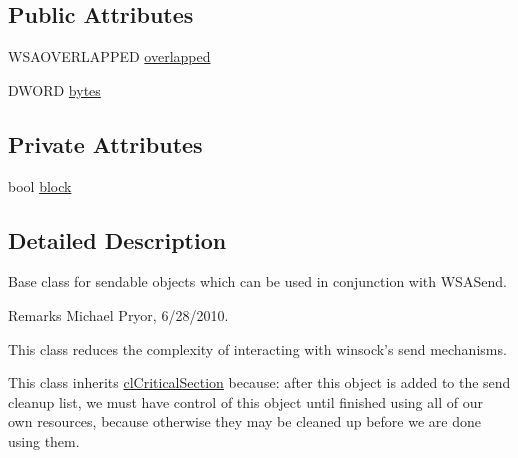 \subsection*{Public Attributes}
\begin{DoxyCompactItemize}
\item 
WSAOVERLAPPED \hyperlink{classcl_shared_send_af20ae880d98268e62f8220e9410fd91e}{overlapped}
\item 
DWORD \hyperlink{classcl_shared_send_a811a267109369803359a763066f8e5e2}{bytes}
\end{DoxyCompactItemize}
\subsection*{Private Attributes}
\begin{DoxyCompactItemize}
\item 
bool \hyperlink{classcl_shared_send_aaaf411d2405cc3447a3bc11fe2ab2678}{block}
\end{DoxyCompactItemize}


\subsection{Detailed Description}
Base class for sendable objects which can be used in conjunction with WSASend. \begin{DoxyRemark}{Remarks}
Michael Pryor, 6/28/2010.
\end{DoxyRemark}
This class reduces the complexity of interacting with winsock's send mechanisms.

This class inherits \hyperlink{classcl_critical_section}{clCriticalSection} because: after this object is added to the send cleanup list, we must have control of this object until finished using all of our own resources, because otherwise they may be cleaned up before we are done using them. 

